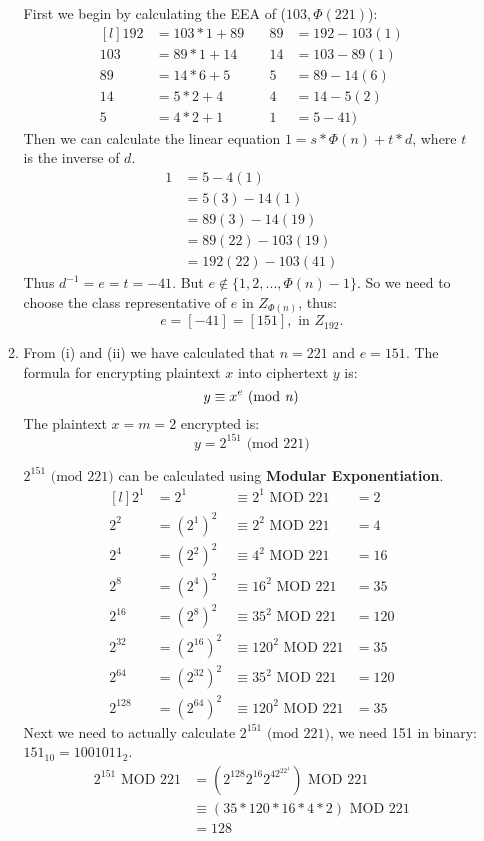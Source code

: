 \documentclass{article}
\begin{document}
\begin{enumerate}
\begin{enumerate}
			First we begin by calculating the EEA of ($103, \Phi(221)$):
			\[
			\begin{matrix*}[l]
				192&=103 * 1 + 89 & \quad89& = 192 -103(1)\\
				103&=89*1+14 &\quad 14&=103-89(1)\\
				89&=14*6+5 & \quad5 &= 89-14(6)\\
				14&=5*2+4 &\quad 4 &=14-5(2)\\
				5&=4 *2 +1 &\quad 1 &=5-41)
			\end{matrix*}
			\]
			Then we can calculate the linear equation $1 = s*\Phi(n) + t*d$, where $t$ is the inverse of $d$. 
			\[
			\begin{split}
				1&=5-4(1)\\
				&=5(3)-14(1)\\
				&=89(3)-14(19)\\
				&=89(22)-103(19)\\
				&=192(22)-103(41)
			\end{split}
			\] 
			Thus $d^{-1} = e = t = -41$. But $e \not\in \{1,2,...,\Phi(n)-1 \}$. So we need to choose the class representative of $e$ in $Z_{\Phi(n)}$, thus:
			$$
			e = [-41] = [151], \text{ in } Z_{192}.
			$$
			

			\item From (i) and (ii) we have calculated that $n=221$ and $e=151$. The formula for encrypting plaintext $x$ into ciphertext $y$ is:
			$$
			y \equiv x^e \text{ (mod \textit{n})}
			$$ 
			The plaintext $x = m = 2$ encrypted is:
			$$
			y=2^{151} \text{ (mod 221)}
			$$
			
			$2^{151} \text{ (mod $221$)}$ can be calculated using \textbf{Modular Exponentiation}.
			\[
			\begin{matrix*}[l]
				2^1&=2^1&\equiv 2^1 \text{ MOD } 221 &=2\\
				2^{2}&=(2^{1})^{2}&\equiv 2^{2} \text{ MOD } 221 &=4\\
				2^{4}&=(2^{2})^{2}&\equiv 4^{2} \text{ MOD } 221 &=16\\
				2^{8}&=(2^{4})^{2}&\equiv 16^{2} \text{ MOD } 221 &=35\\
				2^{16}&=(2^{8})^{2}&\equiv 35^{2} \text{ MOD } 221 &=120\\
				2^{32}&=(2^{16})^{2}&\equiv 120^{2} \text{ MOD } 221 &=35\\
				2^{64}&=(2^{32})^{2}&\equiv 35^{2} \text{ MOD } 221 &=120\\
				2^{128}&=(2^{64})^{2}&\equiv 120^{2} \text{ MOD } 221 &=35
			\end{matrix*}
			\]
			Next we need to actually calculate $2^{151} \text{ (mod $221$)}$, we need 151 in binary: $151_{10} = 1001011_2$.
			\[
			\begin{split}
				2^{151} \text{ MOD } 221 &= (2^{128}2^{16}2^42^22^1) \text{ MOD } 221\\
				&\equiv (35*120*16*4*2) \text{ MOD } 221 \\
				&= 128
			\end{split}
			\]
			

\end{enumerate}
\end{enumerate}
\end{document}
